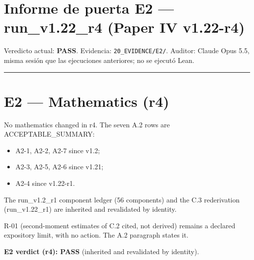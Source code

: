 \documentclass[
]{article}
\author{}
\date{}
\providecommand{\tightlist}{%
  \setlength{\itemsep}{0pt}\setlength{\parskip}{0pt}}
\begin{document}
\section{Informe de puerta E2 --- run\_v1.22\_r4 (Paper IV
v1.22-r4)}\label{informe-de-puerta-e2--run_v122_r4-paper-iv-v122-r4}

Veredicto actual: \textbf{PASS}. Evidencia: \texttt{20\_EVIDENCE/E2/}.
Auditor: Claude Opus 5.5, misma sesión que las ejecuciones anteriores;
no se ejecutó Lean.

\begin{center}\rule{0.5\linewidth}{0.5pt}\end{center}

\section{E2 --- Mathematics (r4)}\label{e2--mathematics-r4}

No mathematics changed in r4. The seven A.2 rows are
ACCEPTABLE\_SUMMARY:

\begin{itemize}
\tightlist
\item
  A2-1, A2-2, A2-7 since v1.2;
\item
  A2-3, A2-5, A2-6 since v1.21;
\item
  A2-4 since v1.22-r1.
\end{itemize}

The run\_v1.2\_r1 component ledger (56 components) and the C.3
rederivation (run\_v1.22\_r1) are inherited and revalidated by identity.

R-01 (second-moment estimates of C.2 cited, not derived) remains a
declared expository limit, with no action. The A.2 paragraph states it.

\textbf{E2 verdict (r4): PASS} (inherited and revalidated by identity).
\end{document}
